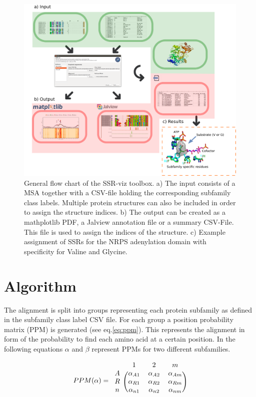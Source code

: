 \documentclass[a4paper,10pt]{article}
\begin{document}
\begin{figure}
  \includegraphics[width=\linewidth]{./figs/flow_chart}
  \caption{General flow chart of the SSR-viz toolbox. a) The input consists 
of a MSA together with a CSV-file holding the corresponding subfamily class labels. 
Multiple protein structures can also be included in order to assign the 
structure indices. b) The output can be created as a mathplotlib PDF, a Jalview annotation file
or a summary CSV-File. This file is used to assign the indices of the structure.
c) Example assignment of SSRs for the NRPS adenylation domain with specificity for Valine and Glycine.}
  \label{fig:flow_chart}
\end{figure}

\section{Algorithm} \label{algo}

The alignment is split into groups representing each protein subfamily as defined in the 
subfamily class label CSV file.
For each group a position probability matrix (PPM) is generated (see eq.\ref{eq:ppm}).
This represents the alignment in form of the probability to find each amino acid at a certain position.
In the following equations $\alpha$ and $\beta$ represent PPMs for two different subfamilies. 

\begin{equation} \label{eq:ppm}
PPM(\alpha) =
\begin{blockarray}{cccc}
 & 1 & 2  & m  \\
\begin{block}{c(ccc)}
  A & \alpha_{A1} & \alpha_{A2}  & \alpha_{Am} \\
  R & \alpha_{R1} & \alpha_{R2}  & \alpha_{Rm} \\
  n & \alpha_{n1} & \alpha_{n2}  & \alpha_{nm} \\
\end{block}
\end{blockarray}
\end{equation}
\end{document}
